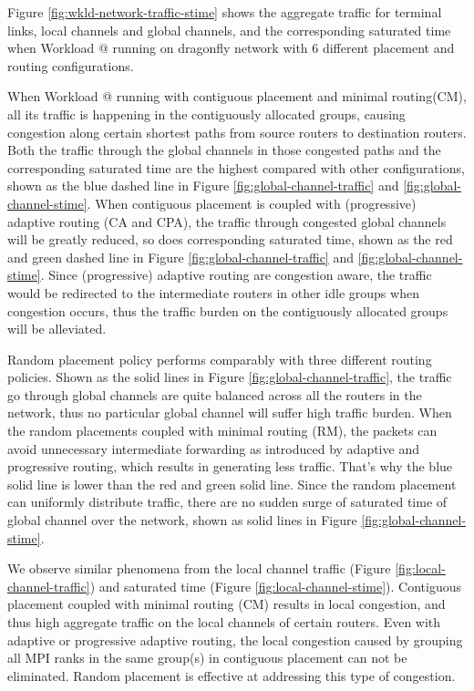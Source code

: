 \documentclass[conference,compsoc]{IEEEtran}
\makeatletter
\newcommand{\Rmnum}[1]{\expandafter\@slowromancap\romannumeral #1@}
\makeatother
\begin{document}
Figure \ref{fig:wkld-network-traffic-stime} shows the aggregate traffic for terminal links, local channels and global channels, and the corresponding saturated time when Workload \Rmnum{1} running on dragonfly network with 6 different placement and routing configurations. 

When Workload \Rmnum{1} running with contiguous placement and minimal routing(CM), all its traffic is happening in the contiguously allocated groups, causing congestion along certain shortest paths from source routers to destination routers. Both the traffic through the global channels in those congested paths and the corresponding saturated time are the highest compared with other configurations, shown as the blue dashed line in Figure \ref{fig:global-channel-traffic} and \ref{fig:global-channel-stime}.
When contiguous placement is coupled with (progressive) adaptive routing (CA and CPA), the traffic through congested global channels will be greatly reduced, so does corresponding saturated time, shown as the red and green dashed line in Figure \ref{fig:global-channel-traffic} and \ref{fig:global-channel-stime}. Since (progressive) adaptive routing are congestion aware, the traffic would be redirected to the intermediate routers in other idle groups when congestion occurs, thus the traffic burden on the contiguously allocated groups will be alleviated. 


Random placement policy performs comparably with three different routing policies.
Shown as the solid lines in Figure \ref{fig:global-channel-traffic}, the traffic go through global channels are quite balanced across all the routers in the network, thus no particular global channel will suffer high traffic burden. When the random placements coupled with minimal routing (RM), the packets can avoid unnecessary intermediate forwarding as introduced by adaptive and progressive routing, which results in generating less traffic. That's why the blue solid line is lower than the red and green solid line. Since the random placement can uniformly distribute traffic, there are no sudden surge of saturated time of global channel over the network, shown as solid lines in Figure \ref{fig:global-channel-stime}. 


We observe similar phenomena from the local channel traffic (Figure \ref{fig:local-channel-traffic}) and saturated time (Figure \ref{fig:local-channel-stime}). Contiguous placement coupled with minimal routing (CM) results in local congestion, and thus high aggregate traffic on the local channels of certain routers. Even with adaptive or progressive adaptive routing, the local congestion caused by grouping all MPI ranks in the same group(s) in contiguous placement can not be eliminated. Random placement is effective at addressing this type of congestion. 
\end{document}
